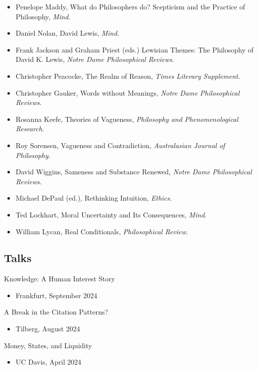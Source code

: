 \documentclass[
  10pt,
  letterpaper,
  DIV=11,
  numbers=noendperiod,
  twoside]{scrartcl}
\providecommand{\tightlist}{%
  \setlength{\itemsep}{0pt}\setlength{\parskip}{0pt}}\usepackage{longtable,booktabs,array}
\begin{document}
\begin{itemize}
\tightlist
\item
  Penelope Maddy, What do Philosophers do? Scepticism and the Practice
  of Philosophy, \emph{Mind}.
\item
  Daniel Nolan, David Lewis, \emph{Mind}.
\item
  Frank Jackson and Graham Priest (eds.) Lewisian Themes: The Philosophy
  of David K. Lewis, \emph{Notre Dame Philosophical Reviews}.
\item
  Christopher Peacocke, The Realm of Reason, \emph{Times Literary
  Supplement}.
\item
  Christopher Gauker, Words without Meanings, \emph{Notre Dame
  Philosophical Reviews}.
\item
  Rosanna Keefe, Theories of Vagueness, \emph{Philosophy and
  Phenomenological Research}.
\item
  Roy Sorensen, Vagueness and Contradiction, \emph{Australasian Journal
  of Philosophy}.
\item
  David Wiggins, Sameness and Substance Renewed, \emph{Notre Dame
  Philosophical Reviews}.
\item
  Michael DePaul (ed.), Rethinking Intuition, \emph{Ethics}.
\item
  Ted Lockhart, Moral Uncertainty and Its Consequences, \emph{Mind}.
\item
  William Lycan, Real Conditionals, \emph{Philosophical Review}.
\end{itemize}

\newpage

\subsection{Talks}\label{talks}

Knowledge: A Human Interest Story

\begin{itemize}
\tightlist
\item
  Frankfurt, September 2024
\end{itemize}

A Break in the Citation Patterns?

\begin{itemize}
\tightlist
\item
  Tilberg, August 2024
\end{itemize}

Money, States, and Liquidity

\begin{itemize}
\tightlist
\item
  UC Davis, April 2024
\end{itemize}
\end{document}
